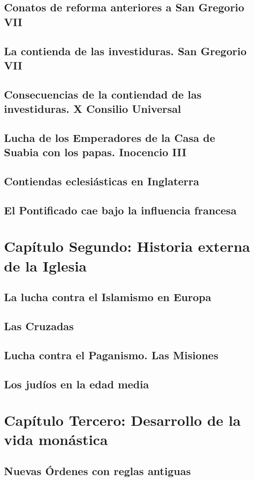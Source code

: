 \raggedbottom{} \documentclass[12pt, a4paper, openany]{book} %
\begin{document}
\section{Conatos de reforma anteriores a San Gregorio VII}
\section{La contienda de las investiduras. San Gregorio VII}
\section{Consecuencias de la contiendad de las investiduras. X Consilio Universal}
\section{Lucha de los Emperadores de la Casa de Suabia con los papas. Inocencio III}
\section{Contiendas eclesiásticas en Inglaterra}
\section{El Pontificado cae bajo la influencia francesa}
\chapter{Capítulo Segundo: Historia externa de  la Iglesia}
\section{La lucha contra el Islamismo en Europa}
\section{Las Cruzadas}
\section{Lucha contra el Paganismo. Las Misiones}
\section{Los judíos en la edad media}
\chapter{Capítulo Tercero: Desarrollo de la vida monástica}
\section{Nuevas Órdenes con reglas antiguas}
\end{document}
